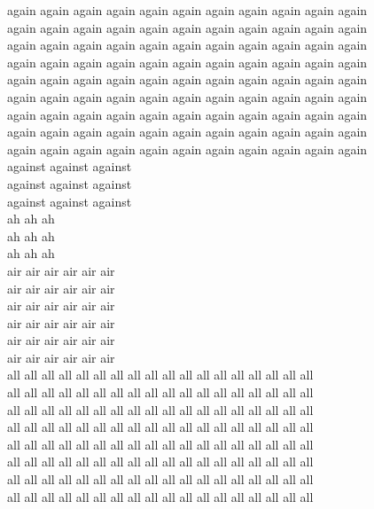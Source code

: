 again again again again again again again again again again again\\
again again again again again again again again again again again\\
again again again again again again again again again again again\\
again again again again again again again again again again again\\
again again again again again again again again again again again\\
again again again again again again again again again again again\\
again again again again again again again again again again again\\
again again again again again again again again again again again\\
again again again again again again again again again again again\\
against against against\\
against against against\\
against against against\\
ah ah ah\\
ah ah ah\\
ah ah ah\\
air air air air air air\\
air air air air air air\\
air air air air air air\\
air air air air air air\\
air air air air air air\\
air air air air air air\\
all all all all all all all all all all all all all all all all all all\\
all all all all all all all all all all all all all all all all all all\\
all all all all all all all all all all all all all all all all all all\\
all all all all all all all all all all all all all all all all all all\\
all all all all all all all all all all all all all all all all all all\\
all all all all all all all all all all all all all all all all all all\\
all all all all all all all all all all all all all all all all all all\\
all all all all all all all all all all all all all all all all all all\\
